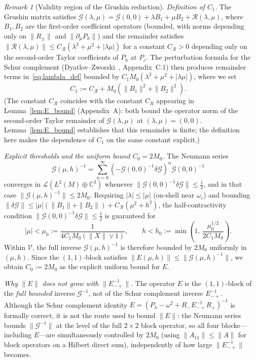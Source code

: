 \documentclass[12pt,a4paper]{amsart}
\theoremstyle{remark}
\newtheorem{remark}[theorem]{Remark}
\begin{document}
\begin{remark}[Validity region of the Grushin reduction]
\emph{Definition of $C_1$.}
The Grushin matrix satisfies
$\mathcal{G}(\lambda,\mu) = \mathcal{G}(0,0) + \lambda B_1 + \mu B_2 + \mathcal{R}(\lambda,\mu)$,
where $B_1, B_2$ are the first-order coefficient operators (bounded, with norms
depending only on $\|R_\pm\|$ and $\|\partial_\mu P_h\|$) and the remainder
satisfies $\|\mathcal{R}(\lambda,\mu)\| \leq C_{\mathcal{R}}(\lambda^2 + \mu^2 + |\lambda\mu|)$
for a constant $C_{\mathcal{R}} > 0$ depending only on the second-order Taylor
coefficients of $P_h$ at $P_c$.
The perturbation formula for the Schur complement (Dyatlov--Zworski~\cite{DZ19},
Appendix~C.1) then produces remainder terms in~\eqref{eq:lambda_def} bounded by
$C_1 M_0 (\lambda^2 + \mu^2 + |\lambda\mu|)$, where we set
\[
  C_1 := C_{\mathcal{R}} + M_0(\|B_1\|^2 + \|B_2\|^2).
\]
(The constant $C_{\mathcal{R}}$ coincides with the constant $C_R$ appearing in
Lemma~\ref{lem:E_bound} (Appendix~A): both bound the operator norm of the second-order
Taylor remainder of $\mathcal{G}(\lambda,\mu)$ at $(\lambda,\mu)=(0,0)$.
Lemma~\ref{lem:E_bound} establishes that this remainder is finite; the definition
here makes the dependence of $C_1$ on the same constant explicit.)

\emph{Explicit thresholds and the uniform bound $C_0 = 2M_0$.}
The Neumann series
\[
  \mathcal{G}(\mu,h)^{-1}
  = \sum_{n=0}^{\infty}(-\mathcal{G}(0,0)^{-1}\delta\mathcal{G})^n \mathcal{G}(0,0)^{-1}
\]
converges in $\mathcal{L}(L^2(M)\oplus\mathbb{C}^3)$ whenever $\|\mathcal{G}(0,0)^{-1}\delta\mathcal{G}\| \leq \tfrac{1}{2}$,
and in that case $\|\mathcal{G}(\mu,h)^{-1}\| \leq 2M_0$.
Requiring $|\lambda| \leq |\mu|$ (on-shell near $\omega_c$) and bounding
$\|\delta\mathcal{G}\| \leq |\mu|(\|B_1\|+\|B_2\|) + C_{\mathcal{R}}(\mu^2+h^2)$,
the half-contractivity condition $\|\mathcal{G}(0,0)^{-1}\delta\mathcal{G}\| \leq \tfrac{1}{2}$
is guaranteed for
\[
  |\mu| < \mu_0 := \frac{1}{4 C_1 M_0 (\|X\| \vee 1)},
  \qquad
  h < h_0 := \min\!\left(1,\,\frac{\mu_0^{1/2}}{2C_1 M_0}\right).
\]
Within $\mathcal{V}$, the full inverse $\mathcal{G}(\mu,h)^{-1}$ is therefore bounded by $2M_0$
uniformly in $(\mu,h)$.
Since the $(1,1)$-block satisfies $\|E(\mu,h)\| \leq \|\mathcal{G}(\mu,h)^{-1}\|$,
we obtain $C_0 := 2M_0$ as the explicit uniform bound for $E$.

\emph{Why $\|E\|$ does not grow with $\|E_{-+}^{-1}\|$.}
The operator $E$ is the $(1,1)$-block of the \emph{full bounded} inverse $\mathcal{G}^{-1}$,
not of the Schur complement inverse $E_{-+}^{-1}$.
Although the Schur complement identity $E = (P_h - \omega^2 + R_- E_{-+}^{-1} R_+)^{-1}$
is formally correct, it is not the route used to bound $\|E\|$:
the Neumann series bounds $\|\mathcal{G}^{-1}\|$ at the level of the full $2\times 2$ block
operator, so all four blocks---including $E$---are simultaneously controlled by $2M_0$
(using $\|A_{11}\|\leq\|A\|$ for block operators on a Hilbert direct sum),
independently of how large $\|E_{-+}^{-1}\|$ becomes.


\end{remark}
\end{document}
